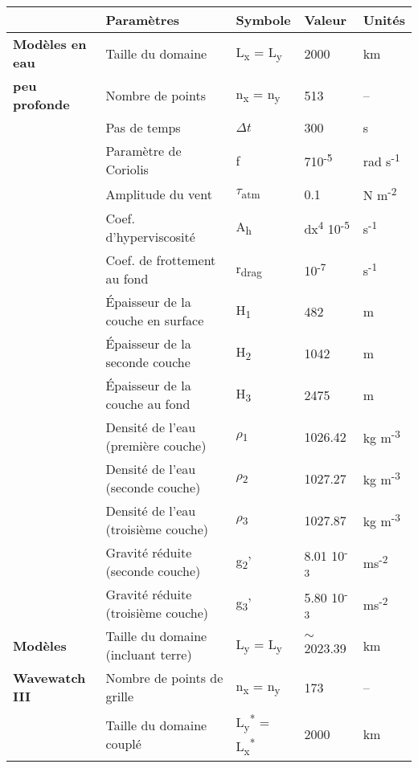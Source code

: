 \documentclass[10pt]{report}
\numberwithin{equation}{section}
\begin{document}
\begin{center}
\begin{tabular}{lllll}
\hline
\hline
 & Paramètres & Symbole & Valeur & Unités\\
\hline
\textbf{Modèles en eau} & Taille du domaine & L\textsubscript{x} = L\textsubscript{y} & 2000 & km\\
\textbf{peu profonde} & Nombre de points & n\textsubscript{x} = n\textsubscript{y} & 513 & --\\
 & Pas de temps & \(\Delta t\) & 300 & s\\
 & Paramètre de Coriolis & f & 7\texttimes{}10\textsuperscript{-5} & rad s\textsuperscript{-1}\\
 & Amplitude du vent & \(\tau\)\textsubscript{atm} & 0.1 & N m\textsuperscript{-2}\\
 & Coef. d'hyperviscosité & A\textsubscript{h} & dx\textsuperscript{4} \texttimes{}10\textsuperscript{-5} & s\textsuperscript{-1}\\
 & Coef. de frottement au fond & r\textsubscript{drag} & 10\textsuperscript{-7} & s\textsuperscript{-1}\\
 & Épaisseur de la couche en surface & H\textsubscript{1} & 482 & m\\
 & Épaisseur de la seconde couche & H\textsubscript{2} & 1042 & m\\
 & Épaisseur de la couche au fond & H\textsubscript{3} & 2475 & m\\
 & Densité de l'eau (première couche) & \(\rho\)\textsubscript{1} & 1026.42 & kg m\textsuperscript{-3}\\
 & Densité de l'eau (seconde couche) & \(\rho\)\textsubscript{2} & 1027.27 & kg m\textsuperscript{-3}\\
 & Densité de l'eau (troisième couche) & \(\rho\)\textsubscript{3} & 1027.87 & kg m\textsuperscript{-3}\\
 & Gravité réduite (seconde couche) & g\textsubscript{2}' & 8.01 \texttimes{} 10\textsuperscript{-3} & ms\textsuperscript{-2}\\
 & Gravité réduite (troisième couche) & g\textsubscript{3}' & 5.80 \texttimes{} 10\textsuperscript{-3} & ms\textsuperscript{-2}\\
\hline
\hline
\textbf{Modèles} & Taille du domaine (incluant terre) & L\textsubscript{y} = L\textsubscript{y} & \(\sim\) 2023.39 & km\\
\textbf{Wavewatch III} & Nombre de points de grille & n\textsubscript{x} = n\textsubscript{y} & 173 & --\\
 & Taille du domaine couplé & L\textsubscript{y}\textsuperscript{*} = L\textsubscript{x}\textsuperscript{*} & 2000 & km\\

\end{tabular}
\end{center}
\end{document}
